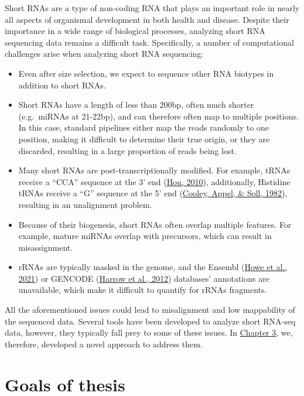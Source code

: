 \documentclass[12pt,twoside]{reedthesis}
\begin{document}
Short RNAs are a type of non-coding RNA that plays an important role in
nearly all aspects of organismal development in both health and disease.
Despite their importance in a wide range of biological processes,
analyzing short RNA sequencing data remains a difficult task.
Specifically, a number of computational challenges arise when analyzing
short RNA sequencing:
\begin{itemize}
\item
  Even after size selection, we expect to sequence other RNA biotypes
  in addition to short RNAs.
\item
  Short RNAs have a length of less than 200bp, often much shorter
  (e.g.~miRNAs at 21-22bp), and can therefore often map to multiple
  positions. In this case, standard pipelines either map the reads
  randomly to one position, making it difficult to determine their
  true origin, or they are discarded, resulting in a large proportion
  of reads being lost.
\item
  Many short RNAs are post-transcriptionally modified. For example,
  tRNAs receive a ``CCA'' sequence at the 3' end (\protect\hyperlink{ref-hou2010}{Hou, 2010}),
  additionally, Histidine tRNAs receive a ``G'' sequence at the 5' end
  (\protect\hyperlink{ref-cooley1982}{Cooley, Appel, \& Soll, 1982}), resulting in an unalignment problem.
\item
  Because of their biogenesis, short RNAs often overlap multiple
  features. For example, mature miRNAs overlap with precursors, which
  can result in misassignment.
\item
  rRNAs are typically masked in the genome, and the Ensembl
  (\protect\hyperlink{ref-howe2021}{Howe et al., 2021}) or GENCODE (\protect\hyperlink{ref-harrow2012}{Harrow et al., 2012}) databases' annotations are
  unavailable, which make it difficult to quantify for rRNAs
  fragments.
\end{itemize}
All the aforementioned issues could lead to misalignment and low
mappability of the sequenced data. Several tools have been developed to
analyze short RNA-seq data, however, they typically fall prey to some of
these issues. In \protect\hyperlink{chapter3}{Chapter 3}, we, therefore, developed a
novel approach to address them.

\hypertarget{goals-of-thesis}{%
\section*{Goals of thesis}\label{goals-of-thesis}}
\end{document}
